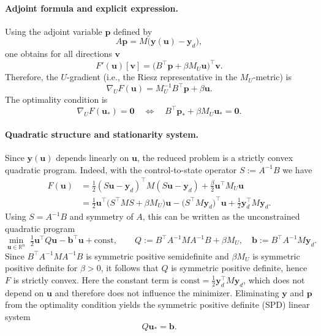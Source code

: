 \documentclass[11pt,a4paper]{article}
\begin{document}
\paragraph{Adjoint formula and explicit expression.}
Using the adjoint variable $\mathbf{p}$ defined by
\begin{equation}
  A\mathbf{p} = M\big(\mathbf{y}(\mathbf{u})-\mathbf{y}_d\big),
\end{equation}
one obtains for all directions $\mathbf{v}$
\begin{equation}
  F'(\mathbf{u})[\mathbf{v}] = \big(B^\top\mathbf{p}+\beta M_U\mathbf{u}\big)^\top\mathbf{v}.
\end{equation}
Therefore, the $U$-gradient (i.e., the Riesz representative in the $M_U$-metric) is
\begin{equation}
  \nabla_U F(\mathbf{u}) = M_U^{-1}B^\top\mathbf{p} + \beta\mathbf{u}.
\end{equation}
The optimality condition is
\begin{equation}
  \nabla_U F(\mathbf{u}_*)=\mathbf{0}
  \quad\Longleftrightarrow\quad
  B^\top\mathbf{p}_* + \beta M_U\mathbf{u}_* = \mathbf{0}.
\end{equation}

\paragraph{Quadratic structure and stationarity system.}
Since $\mathbf{y}(\mathbf{u})$ depends linearly on $\mathbf{u}$, the reduced problem is a strictly convex quadratic program.
Indeed, with the control-to-state operator $S:=A^{-1}B$ we have
\begin{align}
  F(\mathbf{u})
  &= \tfrac12 (S\mathbf{u}-\mathbf{y}_d)^\top M(S\mathbf{u}-\mathbf{y}_d) + \tfrac{\beta}{2}\mathbf{u}^\top M_U\mathbf{u}\\
  &= \tfrac12\mathbf{u}^\top \big(S^\top M S + \beta M_U\big)\mathbf{u} - \big(S^\top M\mathbf{y}_d\big)^\top \mathbf{u} + \tfrac12\mathbf{y}_d^\top M\mathbf{y}_d.
\end{align}
Using $S=A^{-1}B$ and symmetry of $A$, this can be written as the unconstrained quadratic program
\begin{equation}
  \min_{\mathbf{u}\in\mathbb{R}^n}\; \tfrac12\mathbf{u}^\top Q\mathbf{u} - \mathbf{b}^\top \mathbf{u} + \text{const},
  \qquad Q := B^\top A^{-1} M A^{-1} B + \beta M_U,\quad \mathbf{b} := B^\top A^{-1} M\mathbf{y}_d.
\end{equation}
Since $B^\top A^{-1} M A^{-1} B$ is symmetric positive semidefinite and $\beta M_U$ is symmetric positive definite for $\beta>0$, it follows that $Q$ is symmetric positive definite, hence $F$ is strictly convex.
Here the constant term is $\text{const}=\tfrac12\mathbf{y}_d^\top M\mathbf{y}_d$, which does not depend on $\mathbf{u}$ and therefore does not influence the minimizer.
Eliminating $\mathbf{y}$ and $\mathbf{p}$ from the optimality condition yields the symmetric positive definite (SPD) linear system
\begin{equation}
  Q\mathbf{u}_* = \mathbf{b}.
\end{equation}
\end{document}
